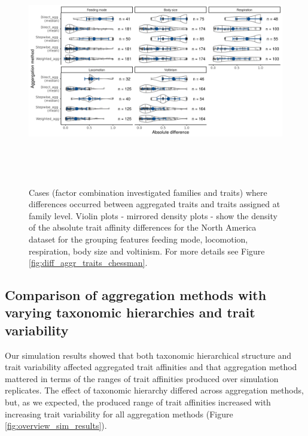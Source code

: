 \documentclass{article}
\begin{document}
\begin{figure}[H]
  \centering
  \includegraphics[width=16.5cm, height=10cm]{Deviances_trait_agg_pyne.png}
  \caption{Cases (factor combination investigated families and traits) where differences occurred between aggregated traits and traits assigned at family level. Violin plots - mirrored density plots - show the density of the absolute trait affinity differences for the North America dataset for the grouping features feeding mode, locomotion, respiration, body size and voltinism. For more details see Figure \ref{fig:diff_aggr_traits_chessman}.}
  \label{fig:diff_aggr_traits_pyne}
\end{figure}

\newpage 


\subsection*{Comparison of aggregation methods with varying taxonomic hierarchies and trait variability}

Our simulation results showed that both taxonomic hierarchical structure and trait variability affected aggregated trait affinities and that aggregation method mattered in terms of the ranges of trait affinities produced over simulation replicates. The effect of taxonomic hierarchy differed across aggregation methods, but, as we expected, the produced range of trait affinities increased with increasing trait variability for all aggregation methods (Figure \ref{fig:overview_sim_results}). %
\end{document}
